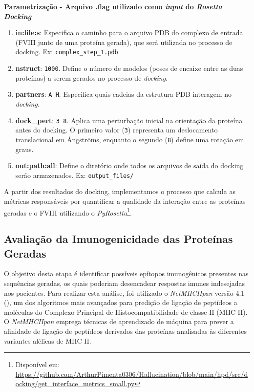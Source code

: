 \textbf{Parametrização - Arquivo .flag utilizado como \textit{input} do \textit{Rosetta Docking}}
\begin{enumerate}
    \item \textbf{in:file:s}: Especifica o caminho para o arquivo PDB do complexo de entrada (FVIII junto de uma proteína gerada), que será utilizada no processo de docking. Ex: \texttt{complex\_step\_1.pdb}
    \item \textbf{nstruct}: \texttt{1000}. Define o número de modelos (poses de encaixe entre as duas proteínas) a serem gerados no processo de \textit{docking}.
    \item \textbf{partners}: \texttt{A\_H}. Especifica quais cadeias da estrutura PDB interagem no \textit{docking}. 
    \item \textbf{dock\_pert}: \texttt{3 8}. Aplica uma perturbação inicial na orientação da proteína antes do docking. O primeiro valor (\texttt{3}) representa um deslocamento translacional em Ångströms, enquanto o segundo (\texttt{8}) define uma rotação em graus.
    \item \textbf{out:path:all}: Define o diretório onde todos os arquivos de saída do docking serão armazenados. Ex: \texttt{output\_files/} 
\end{enumerate}

A partir dos resultados do docking, implementamos
o processo que calcula as métricas responsáveis por quantificar 
a qualidade da interação entre as proteínas geradas e o FVIII utilizando o \textit{PyRosetta}\footnote{Disponível em: \url{https://github.com/ArthurPimenta0306/Hallucination/blob/main/hpd/src/docking/get_interface_metrics_small.py}}. 

\subsection{Avaliação da Imunogenicidade das Proteínas Geradas}

O objetivo desta etapa é identificar possíveis epítopos imunogênicos presentes nas sequências geradas, 
os quais poderiam desencadear respostas imunes indesejadas nos pacientes.
Para realizar esta análise, foi utilizado o \textit{NetMHCIIpan} versão 4.1 (\cite{Jensen2018NetMHCIIpan}), 
um dos algoritmos mais avançados para predição de ligação de peptídeos a moléculas 
do Complexo Principal de Histocompatibilidade de classe II (MHC II). 
O \textit{NetMHCIIpan} emprega técnicas de aprendizado de máquina para prever a afinidade de ligação de peptídeos 
derivados das proteínas analisadas às diferentes variantes alélicas de MHC II. 

